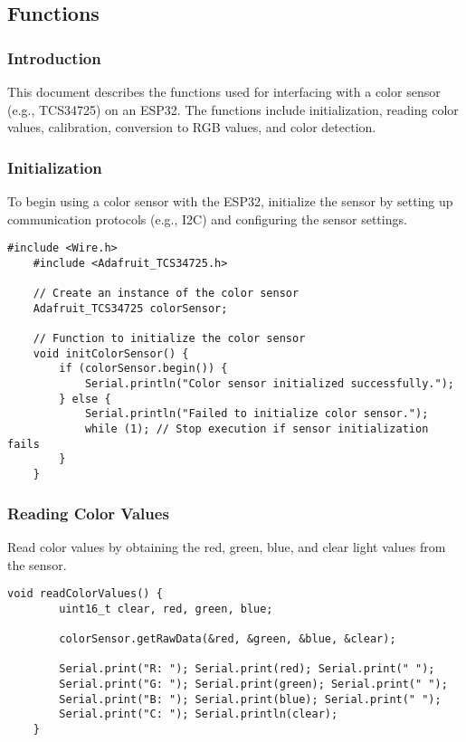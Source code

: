 \subsection{Functions}
\subsubsection*{Introduction}
This document describes the functions used for interfacing with a color sensor (e.g., TCS34725) on an ESP32. The functions include initialization, reading color values, calibration, conversion to RGB values, and color detection.

\subsubsection*{Initialization}
To begin using a color sensor with the ESP32, initialize the sensor by setting up communication protocols (e.g., I2C) and configuring the sensor settings.

\begin{lstlisting}[caption=Initialization of TCS34725 Sensor]
	#include <Wire.h>
	#include <Adafruit_TCS34725.h>
	
	// Create an instance of the color sensor
	Adafruit_TCS34725 colorSensor;
	
	// Function to initialize the color sensor
	void initColorSensor() {
		if (colorSensor.begin()) {
			Serial.println("Color sensor initialized successfully.");
		} else {
			Serial.println("Failed to initialize color sensor.");
			while (1); // Stop execution if sensor initialization fails
		}
	}
\end{lstlisting}

\subsubsection*{Reading Color Values}
Read color values by obtaining the red, green, blue, and clear light values from the sensor.

\begin{lstlisting}[caption=Reading Color Values]
	void readColorValues() {
		uint16_t clear, red, green, blue;
		
		colorSensor.getRawData(&red, &green, &blue, &clear);
		
		Serial.print("R: "); Serial.print(red); Serial.print(" ");
		Serial.print("G: "); Serial.print(green); Serial.print(" ");
		Serial.print("B: "); Serial.print(blue); Serial.print(" ");
		Serial.print("C: "); Serial.println(clear);
	}
\end{lstlisting}

